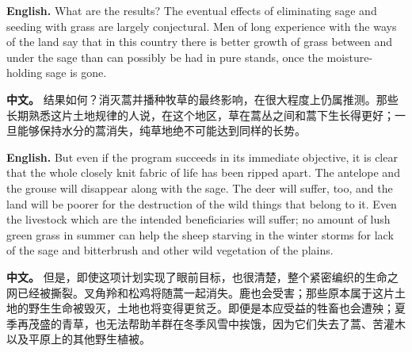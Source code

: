 \noindent\textbf{English.} What are the results? The eventual effects of eliminating sage and seeding with grass are largely conjectural. Men of long experience with the ways of the land say that in this country there is better growth of grass between and under the sage than can possibly be had in pure stands, once the moisture-holding sage is gone.
\par
\noindent\textbf{中文。} 结果如何？消灭蒿并播种牧草的最终影响，在很大程度上仍属推测。那些长期熟悉这片土地规律的人说，在这个地区，草在蒿丛之间和蒿下生长得更好；一旦能够保持水分的蒿消失，纯草地绝不可能达到同样的长势。
\par\medskip

\noindent\textbf{English.} But even if the program succeeds in its immediate objective, it is clear that the whole closely knit fabric of life has been ripped apart. The antelope and the grouse will disappear along with the sage. The deer will suffer, too, and the land will be poorer for the destruction of the wild things that belong to it. Even the livestock which are the intended beneficiaries will suffer; no amount of lush green grass in summer can help the sheep starving in the winter storms for lack of the sage and bitterbrush and other wild vegetation of the plains.
\par
\noindent\textbf{中文。} 但是，即使这项计划实现了眼前目标，也很清楚，整个紧密编织的生命之网已经被撕裂。叉角羚和松鸡将随蒿一起消失。鹿也会受害；那些原本属于这片土地的野生生命被毁灭，土地也将变得更贫乏。即便是本应受益的牲畜也会遭殃；夏季再茂盛的青草，也无法帮助羊群在冬季风雪中挨饿，因为它们失去了蒿、苦灌木以及平原上的其他野生植被。
\par\medskip

